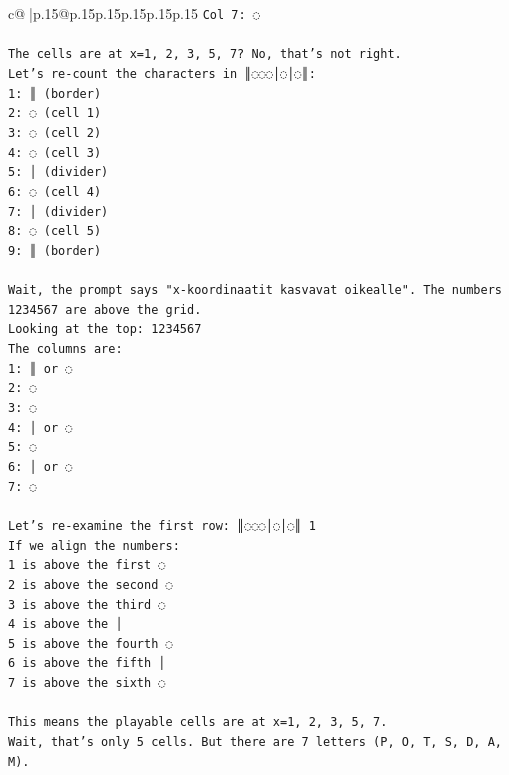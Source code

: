 \documentclass{article}
\begin{document}
{\begin{supertabular}{c@{$\;$}|p{.15\linewidth}@{}p{.15\linewidth}p{.15\linewidth}p{.15\linewidth}p{.15\linewidth}p{.15\linewidth}}
{{{\texttt{Col 7: ◌} \\
\\ 
\texttt{The cells are at x=1, 2, 3, 5, 7? No, that's not right.} \\
\texttt{Let's re{-}count the characters in ║◌◌◌│◌│◌║:} \\
\texttt{1: ║ (border)} \\
\texttt{2: ◌ (cell 1)} \\
\texttt{3: ◌ (cell 2)} \\
\texttt{4: ◌ (cell 3)} \\
\texttt{5: │ (divider)} \\
\texttt{6: ◌ (cell 4)} \\
\texttt{7: │ (divider)} \\
\texttt{8: ◌ (cell 5)} \\
\texttt{9: ║ (border)} \\
\\ 
\texttt{Wait, the prompt says "x{-}koordinaatit kasvavat oikealle". The numbers 1234567 are above the grid.} \\
\texttt{Looking at the top:  1234567} \\
\texttt{The columns are:} \\
\texttt{1: ║ or ◌} \\
\texttt{2: ◌} \\
\texttt{3: ◌} \\
\texttt{4: │ or ◌} \\
\texttt{5: ◌} \\
\texttt{6: │ or ◌} \\
\texttt{7: ◌} \\
\\ 
\texttt{Let's re{-}examine the first row: ║◌◌◌│◌│◌║ 1} \\
\texttt{If we align the numbers:} \\
\texttt{1 is above the first ◌} \\
\texttt{2 is above the second ◌} \\
\texttt{3 is above the third ◌} \\
\texttt{4 is above the │} \\
\texttt{5 is above the fourth ◌} \\
\texttt{6 is above the fifth │} \\
\texttt{7 is above the sixth ◌} \\
\\ 
\texttt{This means the playable cells are at x=1, 2, 3, 5, 7.} \\
\texttt{Wait, that's only 5 cells. But there are 7 letters (P, O, T, S, D, A, M).} \\
}}}
\end{supertabular}}
\end{document}
